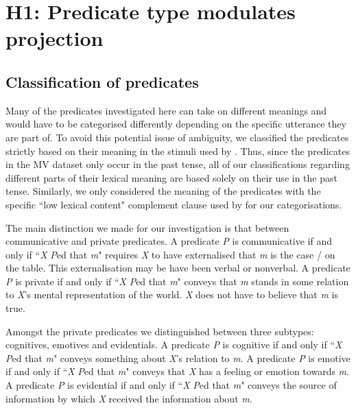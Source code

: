 \documentclass[11pt,fleqn]{article}
\newcommand{\6}{\mbox{$[\hspace*{-.6mm}[$}}
\newcommand{\9}{\mbox{$]\hspace*{-.6mm}]$}}
\begin{document}
\section{H1: Predicate type modulates projection}

\subsection{Classification of predicates}
Many of the predicates investigated here can take on different meanings and would have to be categorised differently depending on the specific utterance they are part of. To avoid this potential issue of ambiguity, we classified the predicates strictly based on their meaning in the stimuli used by \cite{white-rawlins-nels2018}. Thus, since the predicates in the MV dataset only occur in the past tense, all of our classifications regarding different parts of their lexical meaning are based solely on their use in the past tense. Similarly, we only considered the meaning of the predicates with the specific ``low lexical content" complement clause used by \cite{white-rawlins-nels2018} for our categorisations.

The main distinction we made for our investigation is that between communicative and private predicates. A predicate \emph{P} is communicative if and only if ``\emph{X} \emph{P}ed that \emph{m}" requires \emph{X} to have externalised that \emph{m} is the case / on the table. This externalisation may be have been verbal or nonverbal. A predicate \emph{P} is private if and only if ``\emph{X} \emph{P}ed that \emph{m}" conveys that \emph{m} stands in some relation to \emph{X}'s mental representation of the world. \emph{X} does not have to believe that \emph{m} is true.

Amongst the private predicates we distinguished between three subtypes: cognitives, emotives and evidentials. A predicate \emph{P} is cognitive if and only if ``\emph{X} \emph{P}ed that \emph{m}" conveys something about \emph{X}'s relation to \emph{m}. A predicate \emph{P} is emotive if and only if ``\emph{X} \emph{P}ed that \emph{m}" conveys that \emph{X} has a feeling or emotion towards \emph{m}. A predicate \emph{P} is evidential if and only if ``\emph{X} \emph{P}ed that \emph{m}" conveys the source of information by which \emph{X} received the information about \emph{m}.
\end{document}
